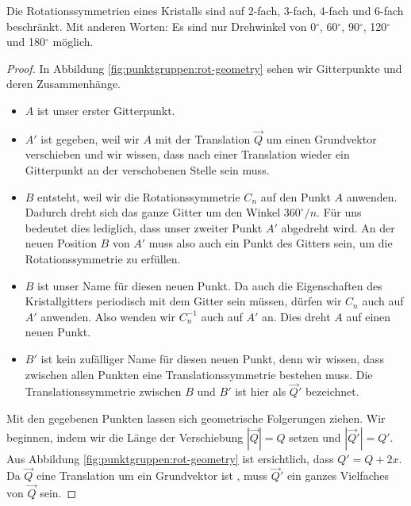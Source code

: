 \begin{satz} \label{thm:punktgruppen:crystal-restriction}
   Die Rotationssymmetrien eines Kristalls sind auf 2-fach, 3-fach, 4-fach und 6-fach beschränkt.
   Mit anderen Worten: Es sind nur Drehwinkel von
    0\(^{\circ}\),
    60\(^{\circ}\),
    90\(^{\circ}\),
    120\(^{\circ}\) und
    180\(^{\circ}\)
   m\"oglich.
\end{satz}

\begin{proof}
 In Abbildung \ref{fig:punktgruppen:rot-geometry} sehen wir Gitterpunkte und deren Zusammenhänge.

 \begin{itemize}
     \item  \(A\) ist unser erster Gitterpunkt. 

     \item  \(A'\) ist gegeben, weil wir \(A\) mit der Translation \(\vec{Q}\) um einen Grundvektor verschieben und wir wissen, 
            dass nach einer Translation wieder ein Gitterpunkt an der verschobenen Stelle sein muss.
     \item \(B\) entsteht, weil wir die Rotationssymmetrie \(C_n\) auf den Punkt \(A\) anwenden.
         Dadurch dreht sich das ganze Gitter um den Winkel \(360^\circ/n\). 
         Für uns bedeutet dies lediglich, dass unser zweiter Punkt \(A'\) abgedreht wird.
         An der neuen Position \(B\) von \(A'\) muss also auch ein Punkt des Gitters sein, um die Rotationssymmetrie zu erfüllen.
     \item \(B\) ist unser Name für diesen neuen Punkt.
         Da auch die Eigenschaften des Kristallgitters periodisch mit dem Gitter sein müssen, dürfen wir \(C_n\) auch auf \(A'\) anwenden.
         Also wenden wir \(C_n^{-1}\) auch auf \(A'\) an. 
         Dies dreht \(A\) auf einen neuen Punkt.
     \item \(B'\) ist kein zufälliger Name für diesen neuen Punkt, denn wir wissen, dass zwischen allen Punkten eine Translationssymmetrie bestehen muss.
         Die  Translationssymmetrie zwischen \(B\) und \(B'\) ist hier als \(\vec{Q}'\) bezeichnet.
 \end{itemize}  
 Mit den gegebenen Punkten lassen sich geometrische Folgerungen ziehen.
 Wir beginnen, indem wir die Länge der Verschiebung \(|\vec{Q}| = Q\) setzen und \(|\vec{Q}'| = Q'\).
 Aus Abbildung \ref{fig:punktgruppen:rot-geometry} ist ersichtlich, dass \(Q' = Q + 2x\).
 Da \(\vec{Q}\) eine Translation um ein Grundvektor ist , muss \(\vec{Q}'\) ein ganzes Vielfaches von \(\vec{Q}\) sein.

\end{proof}

